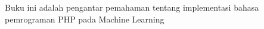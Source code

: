 Buku ini adalah pengantar pemahaman tentang implementasi bahasa pemrograman PHP pada Machine Learning

